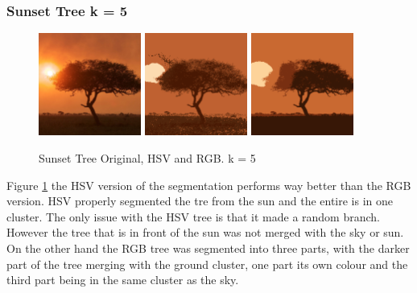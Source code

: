 \documentclass{article}
\begin{document}
\subsubsection{Sunset Tree k = 5}

\begin{figure}[!ht]
\begin{center}
\includegraphics[width=0.3\textwidth]{images/sunset_tree}
\includegraphics[width=0.3\textwidth]{images/hsv_5_sunset}
\includegraphics[width=0.3\textwidth]{images/rgb_5_sunset}
\caption{Sunset Tree Original, HSV and RGB. k = 5}
\label{fig:sunset}
\end{center}
\end{figure}

Figure \ref{fig:sunset} the HSV version of the segmentation performs way better
than the RGB version. HSV properly segmented the tre from the sun and the entire
is in one cluster. The only issue with the HSV tree is that it made a random
branch. However the tree that is in front of the sun was not merged with the sky
or sun. On the other hand the RGB tree was segmented into three parts, with the
darker part of the tree merging with the ground cluster, one part its own colour
and the third part being in the same cluster as the sky.

\end{document}
